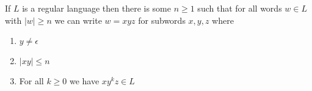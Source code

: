 \documentclass[10pt,a4paper]{article}
\begin{document}
\begin{theorem}
If $L$ is a regular language then there is some $n \geq 1$ such that for all words $w \in L$ with $|w| \geq n$ we can write $w = xyz$ for subwords $x, y, z$ where
\begin{enumerate}
\item $y \neq \epsilon$
\item $|xy| \leq n$
\item For all $k \geq 0$ we have $xy^k z \in L$
\end{enumerate}
\end{theorem}
\end{document}
